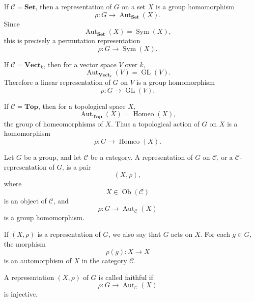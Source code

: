 \begin{example}
    If \(\mathcal{C}=\mathbf{Set}\), then a representation of \(G\) on a set \(X\) is a
    group homomorphism
    \[
        \rho:G\longrightarrow \operatorname{Aut}_{\mathbf{Set}}(X).
    \]
    Since
    \[
        \operatorname{Aut}_{\mathbf{Set}}(X)=\operatorname{Sym}(X),
    \]
    this is precisely a permutation representation
    \[
        \rho:G\longrightarrow \operatorname{Sym}(X).
    \]
\end{example}

\begin{example}
    If \(\mathcal{C}=\mathbf{Vect}_k\), then for a vector space \(V\) over \(k\),
    \[
        \operatorname{Aut}_{\mathbf{Vect}_k}(V)=\operatorname{GL}(V).
    \]
    Therefore a linear representation of \(G\) on \(V\) is a group homomorphism
    \[
        \rho:G\longrightarrow \operatorname{GL}(V).
    \]
\end{example}

\begin{example}
    If \(\mathcal{C}=\mathbf{Top}\), then for a topological space \(X\),
    \[
        \operatorname{Aut}_{\mathbf{Top}}(X)=\operatorname{Homeo}(X),
    \]
    the group of homeomorphisms of \(X\). Thus a topological action of \(G\) on \(X\)
    is a homomorphism
    \[
        \rho:G\longrightarrow \operatorname{Homeo}(X).
    \]
\end{example}

\begin{definition}
    Let \(G\) be a group, and let \(\mathcal{C}\) be a category.
    A representation of \(G\) on \(\mathcal{C}\), or a
    \(\mathcal{C}\)-representation of \(G\), is a pair
    \[
        (X,\rho),
    \]
    where
    \[
        X\in \operatorname{Ob}(\mathcal{C})
    \]
    is an object of \(\mathcal{C}\), and
    \[
        \rho:G\longrightarrow \operatorname{Aut}_{\mathcal{C}}(X)
    \]
    is a group homomorphism.
\end{definition}

\begin{remark}
    If \((X,\rho)\) is a representation of \(G\), we also say that
    \(G\) acts on \(X\). For each \(g\in G\), the morphism
    \[
        \rho(g):X\longrightarrow X
    \]
    is an automorphism of \(X\) in the category \(\mathcal{C}\).
\end{remark}

\begin{definition}
    A representation \((X,\rho)\) of \(G\) is called faithful if
    \[
        \rho:G\longrightarrow \operatorname{Aut}_{\mathcal{C}}(X)
    \]
    is injective.
\end{definition}

